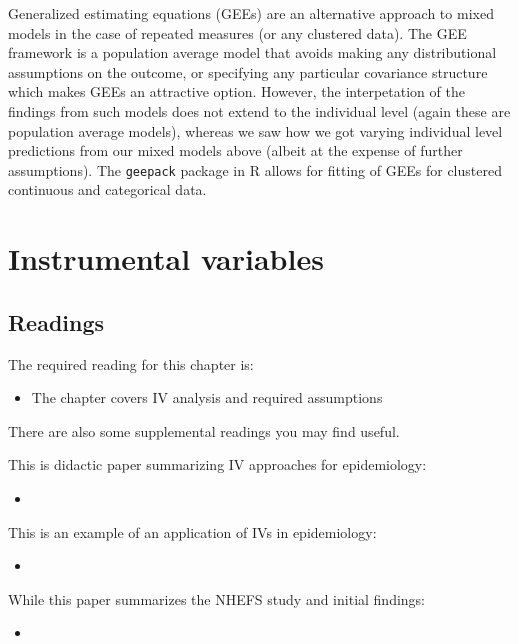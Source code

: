 \documentclass[
]{book}
\providecommand{\tightlist}{%
  \setlength{\itemsep}{0pt}\setlength{\parskip}{0pt}}
\begin{document}
Generalized estimating equations (GEEs) are an alternative approach to mixed models
in the case of repeated measures (or any clustered data). The GEE framework is a
population average model that avoids making any distributional assumptions on the
outcome, or specifying any particular covariance structure which makes GEEs an attractive
option. However, the interpetation of the findings from such models does not extend
to the individual level (again these are population average models), whereas we
saw how we got varying individual level predictions from our mixed models above (albeit
at the expense of further assumptions). The \texttt{geepack} package in R allows for fitting
of GEEs for clustered continuous and categorical data.

\chapter{Instrumental variables}\label{instrumental-variables}

\section{Readings}\label{readings-7}

The required reading for this chapter is:

\begin{itemize}
\tightlist
\item
  \citet{hernanch16} The chapter covers IV analysis and required assumptions
\end{itemize}

There are also some supplemental readings you may find useful.

This is didactic paper summarizing IV approaches for epidemiology:

\begin{itemize}
\tightlist
\item
  \citet{greenland2000introduction}
\end{itemize}

This is an example of an application of IVs in epidemiology:

\begin{itemize}
\tightlist
\item
  \citet{austin2016does}
\end{itemize}

While this paper summarizes the NHEFS study and initial findings:

\begin{itemize}
\tightlist
\item
  \citet{madans198610}
\end{itemize}
\end{document}
